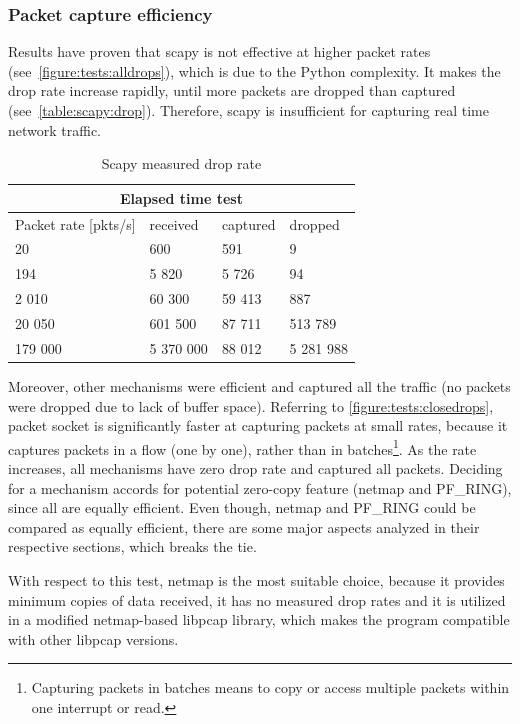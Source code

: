 \documentclass[12pt,a4paper,twoside]{report}
\begin{document}
			\subsubsection*{Packet capture efficiency} \label{analysis:testing:results:capture}
				Results have proven that scapy is not effective at higher packet rates (see~\autoref{figure:tests:alldrops}), which is due to the Python complexity. It makes the drop rate increase rapidly, until more packets are dropped than captured (see~\autoref{table:scapy:drop}). Therefore, scapy is insufficient for capturing real time network traffic.
				\begin{table}[h]
					\centering
				\begin{tabular}{ |p{3cm}||p{3cm}|p{3cm}|p{3cm}| }
 					\hline
 					\multicolumn{4}{|c|}{Elapsed time test} \\
 					\hline
 					Packet rate [pkts/s] & received & captured & dropped \\
 					\hline
 					20	& 600 & 591 & 9 \\
 					194	& 5 820 & 5 726 & 94 \\
 					2 010	& 60 300 & 59 413 & 887 \\
 					20 050	& 601 500 & 87 711 & 513 789 \\
 					179 000	& 5 370 000 & 88 012 & 5 281 988 \\
 					\hline
				\end{tabular}
					\caption{Scapy measured drop rate}
					\label{table:scapy:drop}
				\end{table}
				\par
				Moreover, other mechanisms were efficient and captured all the traffic (no packets were dropped due to lack of buffer space). Referring to \autoref{figure:tests:closedrops}, packet socket is significantly faster at capturing packets at small rates, because it captures packets in a flow (one by one), rather than in batches\footnote{Capturing packets in batches means to copy or access multiple packets within one interrupt or read.}. As the rate increases, all mechanisms have zero drop rate and captured all packets. Deciding for a mechanism accords for potential zero-copy feature (netmap and PF\_RING), since all are equally efficient. Even though, netmap and PF\_RING could be compared as equally efficient, there are some major aspects analyzed in their respective sections, which breaks the tie.\par
				With respect to this test, netmap is the most suitable choice, because it provides minimum copies of data received, it has no measured drop rates and it is utilized in a modified netmap-based libpcap library, which makes the program compatible with other libpcap versions.
\end{document}
